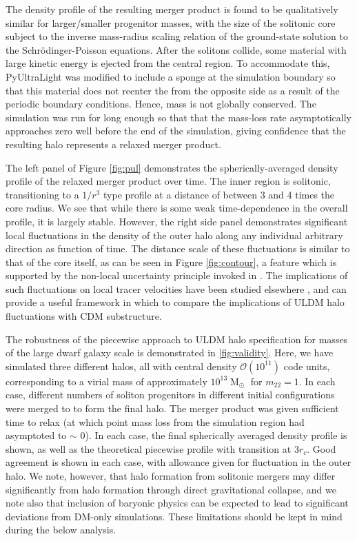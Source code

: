 \documentclass[a4paper,11pt]{article}
\begin{document}
The density profile of the resulting merger product is found to be qualitatively similar for larger/smaller progenitor masses, with the size of the solitonic core subject to the inverse mass-radius scaling relation of the ground-state solution to the Schr{\"o}dinger-Poisson equations. After the solitons collide, some material with large kinetic energy is ejected from the central region. To accommodate this, {\sc PyUltraLight} was modified to include a sponge at the simulation boundary so that this material does not reenter the from the opposite side as a result of the periodic boundary conditions. Hence, mass is not globally conserved. The simulation was run for long enough so that that the mass-loss rate asymptotically approaches zero well before the end of the simulation, giving confidence that the resulting halo represents a relaxed merger product. 

The left panel of Figure \ref{fig:pul} demonstrates the spherically-averaged density profile of the relaxed merger product over time. The inner region is solitonic, transitioning to a $1/r^3$ type profile at a distance of between 3 and 4 times the core radius. We see that while there is some weak time-dependence in the overall profile, it is largely stable. However, the right side panel demonstrates significant local fluctuations in the density of the outer halo along any individual arbitrary direction as function of time. The distance scale of these fluctuations is similar to that of the core itself, as can be seen in Figure \ref{fig:contour}, a feature which is supported by the non-local uncertainty principle invoked in \cite{Schive:2014hza}. The implications of such fluctuations on local tracer velocities have been studied elsewhere \cite{Marsh:2018zyw}, and can provide a useful framework in which to compare the implications of ULDM halo fluctuations with CDM substructure. 

The robustness of the piecewise approach to ULDM halo specification for masses of the large dwarf galaxy scale is demonstrated in \ref{fig:validity}.
Here, we have simulated three different halos, all with central density $\mathcal{O}(10^{11})$ code units, corresponding to a virial mass of approximately $10^{13}\operatorname{M}_{\odot}$ for $m_{22} = 1$. In each case, different numbers of soliton progenitors in different initial configurations were merged to to form the final halo. The merger product was given sufficient time to relax (at which point mass loss from the simulation region had asymptoted to $\sim$ 0). In each case, the final spherically averaged density profile is shown, as well as the theoretical piecewise profile with transition at $3 r_c$. Good agreement is shown in each case, with allowance given for fluctuation in the outer halo. We note, however, that halo formation from solitonic mergers may differ significantly from halo formation through direct gravitational collapse, and we note also that inclusion of baryonic physics can be expected to lead to significant deviations from DM-only simulations. These limitations should be kept in mind during the below analysis.
 
\end{document}
